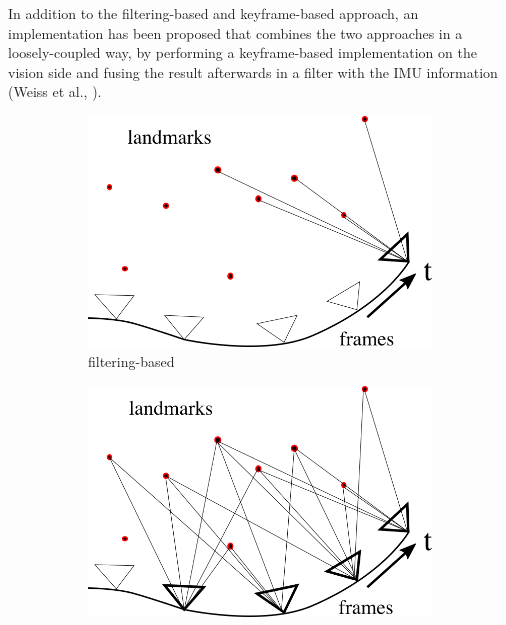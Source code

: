 In addition to the filtering-based and keyframe-based approach, an implementation has been proposed that combines the two approaches in a loosely-coupled way, by performing a keyframe-based implementation on the vision side and fusing the result afterwards in a filter with the IMU information (Weiss et al., \cite{weiss2012real}). \\

\begin{figure}
  \begin{subfigure}[b]{0.4\textwidth}
    \captionsetup{skip=6pt}
    \includegraphics[width=\textwidth]{images/filteringbased_2.png}
    \caption{filtering-based}
    \label{fig:1}
  \end{subfigure}
  \hfill
  \begin{subfigure}[b]{0.4\textwidth}
    \captionsetup{skip=6pt}
    \includegraphics[width=\textwidth]{images/keyframebased_2.png}

\end{subfigure}
\end{figure}
